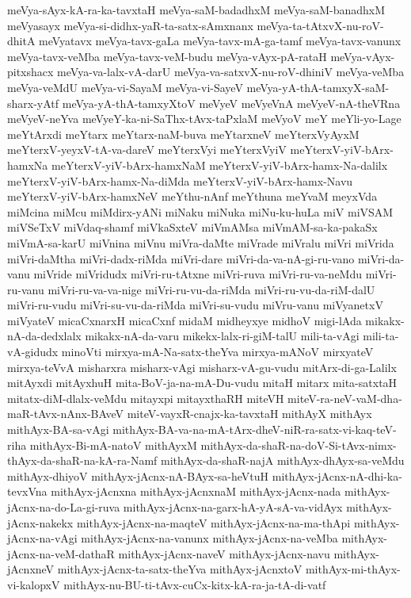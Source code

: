{meVya-sAyx-kA-ra-ka-tavxtaH
meVya-saM-badadhxM
meVya-saM-banadhxM
meVyasayx
meVya-si-didhx-yaR-ta-satx-sAmxnanx
meVya-ta-tAtxvX-nu-roV-dhitA
meVyatavx
meVya-tavx-gaLa
meVya-tavx-mA-ga-tamf
meVya-tavx-vanunx
meVya-tavx-veMba
meVya-tavx-veM-budu
meVya-vAyx-pA-rataH
meVya-vAyx-pitxshacx
meVya-va-lalx-vA-darU
meVya-va-satxvX-nu-roV-dhiniV
meVya-veMba
meVya-veMdU
meVya-vi-SayaM
meVya-vi-SayeV
meVya-yA-thA-tamxyX-saM-sharx-yAtf
meVya-yA-thA-tamxyXtoV
meVyeV
meVyeVnA
meVyeV-nA-theVRna
meVyeV-neYva
meVyeY-ka-ni-SaThx-tAvx-taPxlaM
meVyoV
meY
meYli-yo-Lage
meYtArxdi
meYtarx
meYtarx-naM-buva
meYtarxneV
meYterxVyAyxM
meYterxV-yeyxV-tA-va-dareV
meYterxVyi
meYterxVyiV
meYterxV-yiV-bArx-hamxNa
meYterxV-yiV-bArx-hamxNaM
meYterxV-yiV-bArx-hamx-Na-dalilx
meYterxV-yiV-bArx-hamx-Na-diMda
meYterxV-yiV-bArx-hamx-Navu
meYterxV-yiV-bArx-hamxNeV
meYthu-nAnf
meYthuna
meYvaM
meyxVda
miMcina
miMcu
miMdirx-yANi
miNaku
miNuka
miNu-ku-huLa
miV
miVSAM
miVSeTxV
miVdaq-shamf
miVkaSxteV
miVmAMsa
miVmAM-sa-ka-pakaSx
miVmA-sa-karU
miVnina
miVnu
miVra-daMte
miVrade
miVralu
miVri
miVrida
miVri-daMtha
miVri-dadx-riMda
miVri-dare
miVri-da-va-nA-gi-ru-vano
miVri-da-vanu
miVride
miVridudx
miVri-ru-tAtxne
miVri-ruva
miVri-ru-va-neMdu
miVri-ru-vanu
miVri-ru-va-va-nige
miVri-ru-vu-da-riMda
miVri-ru-vu-da-riM-dalU
miVri-ru-vudu
miVri-su-vu-da-riMda
miVri-su-vudu
miVru-vanu
miVyanetxV
miVyateV
micaCxnarxH
micaCxnf
midaM
midheyxye
midhoV
migi-lAda
mikakx-nA-da-dedxlalx
mikakx-nA-da-varu
mikekx-lalx-ri-giM-talU
mili-ta-vAgi
mili-ta-vA-gidudx
minoVti
mirxya-mA-Na-satx-theYva
mirxya-mANoV
mirxyateV
mirxya-teVvA
misharxra
misharx-vAgi
misharx-vA-gu-vudu
mitArx-di-ga-Lalilx
mitAyxdi
mitAyxhuH
mita-BoV-ja-na-mA-Du-vudu
mitaH
mitarx
mita-satxtaH
mitatx-diM-dlalx-veMdu
mitayxpi
mitayxthaRH
miteVH
miteV-ra-neV-vaM-dha-maR-tAvx-nAnx-BAveV
miteV-vayxR-cnajx-ka-tavxtaH
mithAyX
mithAyx
mithAyx-BA-sa-vAgi
mithAyx-BA-va-na-mA-tArx-dheV-niR-ra-satx-vi-kaq-teV-riha
mithAyx-Bi-mA-natoV
mithAyxM
mithAyx-da-shaR-na-doV-Si-tAvx-nimx-thAyx-da-shaR-na-kA-ra-Namf
mithAyx-da-shaR-najA
mithAyx-dhAyx-sa-veMdu
mithAyx-dhiyoV
mithAyx-jAcnx-nA-BAyx-sa-heVtuH
mithAyx-jAcnx-nA-dhi-ka-tevxVna
mithAyx-jAcnxna
mithAyx-jAcnxnaM
mithAyx-jAcnx-nada
mithAyx-jAcnx-na-do-La-gi-ruva
mithAyx-jAcnx-na-garx-hA-yA-sA-va-vidAyx
mithAyx-jAcnx-nakekx
mithAyx-jAcnx-na-maqteV
mithAyx-jAcnx-na-ma-thApi
mithAyx-jAcnx-na-vAgi
mithAyx-jAcnx-na-vanunx
mithAyx-jAcnx-na-veMba
mithAyx-jAcnx-na-veM-dathaR
mithAyx-jAcnx-naveV
mithAyx-jAcnx-navu
mithAyx-jAcnxneV
mithAyx-jAcnx-ta-satx-theYva
mithAyx-jAcnxtoV
mithAyx-mi-thAyx-vi-kalopxV
mithAyx-nu-BU-ti-tAvx-cuCx-kitx-kA-ra-ja-tA-di-vatf
}
